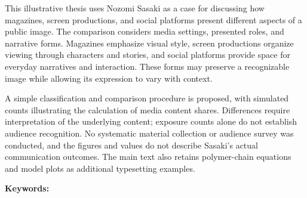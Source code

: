 \scuAbstractEnHeading
This illustrative thesis uses Nozomi Sasaki as a case for discussing how magazines, screen productions, and social platforms present different aspects of a public image. The comparison considers media settings, presented roles, and narrative forms. Magazines emphasize visual style, screen productions organize viewing through characters and stories, and social platforms provide space for everyday narratives and interaction. These forms may preserve a recognizable image while allowing its expression to vary with context.

A simple classification and comparison procedure is proposed, with simulated counts illustrating the calculation of media content shares. Differences require interpretation of the underlying content; exposure counts alone do not establish audience recognition. No systematic material collection or audience survey was conducted, and the figures and values do not describe Sasaki's actual communication outcomes. The main text also retains polymer-chain equations and model plots as additional typesetting examples.

\par\vspace{20bp}\noindent\textbf{Keywords: }\scuKeywordsEn
